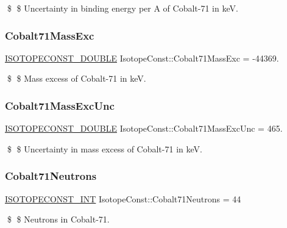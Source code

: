 \$ \$ Uncertainty in binding energy per A of Cobalt-\/71 in keV. \mbox{\label{group___isotope_const-_cobalt-_co71_ga0ea36fafe176f7290a61432639e760ec}} 
\subsubsection{\texorpdfstring{Cobalt71\+Mass\+Exc}{Cobalt71MassExc}}
{\footnotesize\ttfamily \mbox{\hyperlink{group___isotope_const-_macros_ga8f45a7272ce02c0b4c65c44636ed719a}{I\+S\+O\+T\+O\+P\+E\+C\+O\+N\+S\+T\+\_\+\+D\+O\+U\+B\+LE}} Isotope\+Const\+::\+Cobalt71\+Mass\+Exc = -\/44369.}

\$ \$ Mass excess of Cobalt-\/71 in keV. \mbox{\label{group___isotope_const-_cobalt-_co71_gaf5c270425197be5574a4b8339dcae44d}} 
\subsubsection{\texorpdfstring{Cobalt71\+Mass\+Exc\+Unc}{Cobalt71MassExcUnc}}
{\footnotesize\ttfamily \mbox{\hyperlink{group___isotope_const-_macros_ga8f45a7272ce02c0b4c65c44636ed719a}{I\+S\+O\+T\+O\+P\+E\+C\+O\+N\+S\+T\+\_\+\+D\+O\+U\+B\+LE}} Isotope\+Const\+::\+Cobalt71\+Mass\+Exc\+Unc = 465.}

\$ \$ Uncertainty in mass excess of Cobalt-\/71 in keV. \mbox{\label{group___isotope_const-_cobalt-_co71_ga2586fe97e524d304d48f07218544ccd7}} 
\subsubsection{\texorpdfstring{Cobalt71\+Neutrons}{Cobalt71Neutrons}}
{\footnotesize\ttfamily \mbox{\hyperlink{group___isotope_const-_macros_ga5f18360b3e99483a35c32d789e62621c}{I\+S\+O\+T\+O\+P\+E\+C\+O\+N\+S\+T\+\_\+\+I\+NT}} Isotope\+Const\+::\+Cobalt71\+Neutrons = 44}

\$ \$ Neutrons in Cobalt-\/71. \mbox{\label{group___isotope_const-_cobalt-_co71_ga1d53361cd9885645c723fea4d1c7f148}} 
